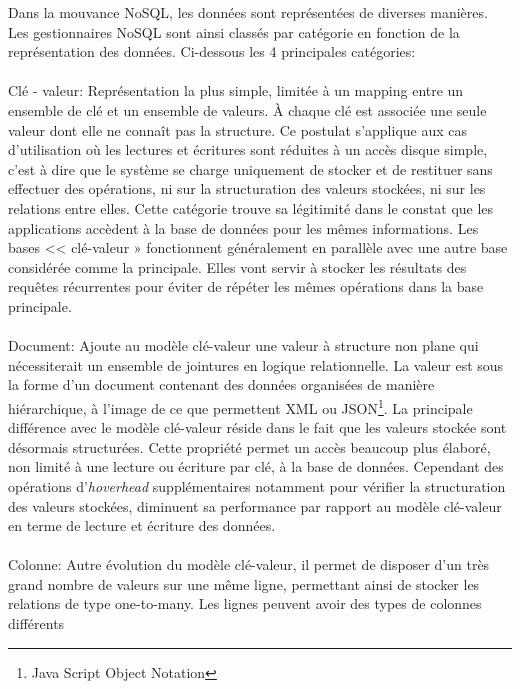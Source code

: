 Dans la mouvance \textsf{NoSQL}, les données sont représentées de
diverses manières. Les gestionnaires \textsf{NoSQL} sont ainsi classés
par catégorie en fonction de la représentation des données. Ci-dessous
les 4 principales catégories:
\\
\\
\textsf{Clé - valeur}: 
Représentation la plus simple, limitée à un mapping entre un ensemble
de clé et un ensemble de valeurs. À chaque clé est associée une seule
valeur dont elle ne connaît pas la structure. Ce postulat s'applique
aux cas d'utilisation où les lectures et écritures sont réduites à un
accès disque simple, c'est à dire que le système se charge uniquement
de stocker et de restituer sans effectuer des opérations, ni sur la
structuration des valeurs stockées, ni sur les relations entre
elles. Cette catégorie trouve sa légitimité dans le constat que les
applications accèdent à la base de données pour les mêmes
informations. Les bases << clé-valeur » fonctionnent généralement en
parallèle avec une autre base considérée comme la principale. Elles
vont servir à stocker les résultats des requêtes récurrentes pour
éviter de répéter les mêmes opérations dans la base
principale\cite{cleValeur}.
\\
\\ 
{\sf Document}: Ajoute au
modèle \textsf{clé-valeur} une valeur à structure non plane qui
nécessiterait un ensemble de jointures en logique relationnelle. La
valeur est sous la forme d'un document contenant des données
organisées de manière hiérarchique, à l’image de ce que permettent
\textsf{XML} ou \textsf{JSON}\footnote{Java Script Object Notation}. 
La principale différence avec le modèle \textsf{clé-valeur} réside
dans le fait que les valeurs stockée sont désormais structurées. Cette
propriété permet un accès beaucoup plus élaboré, non limité à une
lecture ou écriture par clé, à la base de données. Cependant des
opérations d'\textit{hoverhead} supplémentaires notamment pour
vérifier la structuration des valeurs stockées, diminuent sa
performance par rapport au modèle \textsf{clé-valeur} en terme de
lecture et écriture des données.
\\
\\ 
{\sf Colonne}: Autre évolution du modèle
clé-valeur, il permet de disposer d'un très grand nombre de valeurs
sur une même ligne, permettant ainsi de stocker les relations de type
one-to-many. Les lignes peuvent avoir des types de colonnes différents
